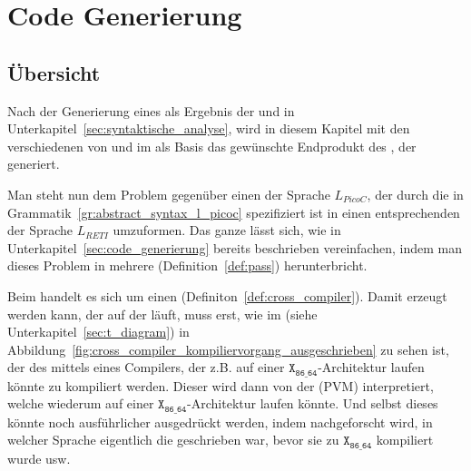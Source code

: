 \section{Code Generierung}
\subsection{Übersicht}
Nach der Generierung eines  als Ergebnis der  und  in Unterkapitel~\ref{sec:syntaktische_analyse}, wird in diesem Kapitel mit den verschiedenen  von  und  im  als Basis das gewünschte Endprodukt des , der  generiert.

Man steht nun dem Problem gegenüber einen  der Sprache $L_{PicoC}$, der durch die  in Grammatik~\ref{gr:abstract_syntax_l_picoc} spezifiziert ist in einen entsprechenden  der Sprache $L_{RETI}$ umzuformen. Das ganze lässt sich, wie in Unterkapitel~\ref{sec:code_generierung} bereits beschrieben vereinfachen, indem man dieses Problem in mehrere  (Definition~\ref{def:pass}) herunterbricht.


Beim  handelt es sich um einen  (Definiton~\ref{def:cross_compiler}). Damit  erzeugt werden kann, der auf der  läuft, muss erst, wie im  (siehe Unterkapitel~\ref{sec:t_diagram}) in Abbildung~\ref{fig:cross_compiler_kompiliervorgang_ausgeschrieben} zu sehen ist, der  des  mittels eines Compilers, der z.B. auf einer $\mathtt{X_{86\_64}}$-Architektur laufen könnte zu  kompiliert werden. Dieser  wird dann von der  (PVM) interpretiert, welche wiederum auf einer $\mathtt{X_{86\_64}}$-Architektur laufen könnte. Und selbst dieses  könnte noch ausführlicher ausgedrückt werden, indem nachgeforscht wird, in welcher Sprache eigentlich die  geschrieben war, bevor sie zu $\mathtt{X_{86\_64}}$ kompiliert wurde usw.

